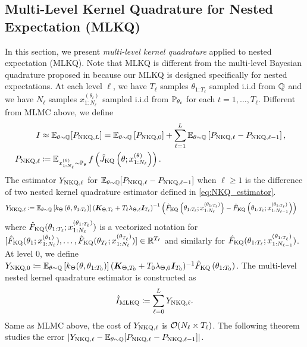 \subsection{Multi-Level Kernel Quadrature for Nested Expectation (MLKQ)}\label{sec:mlnkq}
In this section, we present \emph{multi-level kernel quadrature} applied to nested expectation (MLKQ).
Note that MLKQ is different from the multi-level Bayesian quadrature proposed in \citet{li2023multilevel} because our MLKQ is designed specifically for nested expectations. 
At each level $\ell$, we have $T_\ell$ samples $\theta_{1:T_\ell}$ sampled i.i.d from $\mathbb{Q}$ and we have $N_\ell$ samples $x_{1:N_\ell}^{(\theta_t)}$ sampled i.i.d from $\mathbb{P}_{\theta_t}$ for each $t = 1, \ldots, T_\ell$. 
Different from MLMC above, we define 
\begin{align*}
    I &\approx \operatorname{\mathbb{E}}_{\theta \sim \mathbb{Q}}[P_{\text{NKQ}, L}] = \operatorname{\mathbb{E}}_{\theta \sim \mathbb{Q}}\left[P_{\text{NKQ}, 0}\right] + \sum_{\ell=1}^L \operatorname{\mathbb{E}}_{\theta \sim \mathbb{Q}}\left[P_{\text{NKQ}, \ell} - P_{\text{NKQ}, \ell-1} \right], \quad \\ P_{\text{NKQ}, \ell} &\coloneq \operatorname{\mathbb{E}}_{x_{1:N_\ell}^{(\theta)} \sim \mathbb{P}_{\theta} } f \left(\hat{J}_{\text{KQ}} \left( \theta; x_{1:N_\ell}^{(\theta)} \right) \right).
\end{align*}
The estimator $Y_{\text{NKQ}, \ell}$ for $\operatorname{\mathbb{E}}_{\theta \sim \mathbb{Q}}[P_{\text{NKQ}, \ell} - P_{\text{NKQ}, \ell-1}]$ when $\ell \geq 1$ is the difference of two nested kernel quadrature estimator defined in \eqref{eq:NKQ_estimator}.
\begin{align*}
    Y_{\text{NKQ}, \ell} &\coloneq \operatorname{\mathbb{E}}_{\theta \sim \mathbb{Q}} \left[k_{\Theta}\left(\theta, \theta_{1: T_\ell} \right)\right] \left(\boldsymbol{K}_{\Theta, T_\ell} + T_\ell \lambda_{\Theta, \ell} \boldsymbol{I}_{T_\ell} \right)^{-1} \left( \hat{F}_{\text{KQ}}\left(\theta_{1: T_\ell}; x_{1:N_\ell}^{(\theta_{1:T_\ell} )} \right) - \hat{F}_{\text{KQ}}\left(\theta_{1: T_\ell}; x_{1:N_{\ell - 1} }^{ (\theta_{1:T_\ell}) } \right) \right) 
\end{align*}
where $\hat{F}_{\text{KQ}} (\theta_{1: T_{\ell} }; x_{1:N_{\ell} }^{ (\theta_{1:T_{\ell} } ) })$ is a vectorized notation for $[\hat{F}_{\text{KQ}} (\theta_{1}; x_{1:N_\ell}^{(\theta_1)}), \ldots, \hat{F}_{\text{KQ}} (\theta_{T_{\ell} }; x_{1:N_\ell}^{(\theta_{T_{\ell}})} )] \in \mathbb{R}^{T_{\ell}}$ and similarly for $\hat{F}_{\text{KQ}} (\theta_{1: T_{\ell} }; x_{1:N_{\ell-1} }^{ (\theta_{1:T_{\ell} } ) })$.
At level $0$, we define $Y_{\text{NKQ}, 0} \coloneq \operatorname{\mathbb{E}}_{\theta \sim \mathbb{Q}} \left[k_{\Theta}(\theta, \theta_{1: T_0})\right] (\boldsymbol{K}_{\Theta, T_0} + T_0 \lambda_{\Theta, 0} \boldsymbol{I}_{T_0})^{-1} \hat{F}_{\text{KQ}}\left(\theta_{1: T_0} \right)$.
The multi-level nested kernel quadrature estimator is constructed as
\begin{align*}
    \hat{I}_{\text{MLKQ}} \coloneq \sum_{\ell=0}^L Y_{\text{NKQ}, \ell} .
\end{align*}
Same as MLMC above, the cost of $Y_{\text{NKQ}, \ell}$ is $\mathcal{O}(N_\ell \times T_\ell)$. The following theorem studies the error $| Y_{\text{NKQ}, \ell} - \operatorname{\mathbb{E}}_{\theta \sim \mathbb{Q}}[P_{\text{NKQ}, \ell} - P_{\text{NKQ}, \ell-1} ]|$. 

